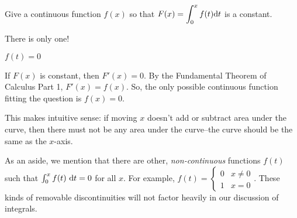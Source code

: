 \begin{question}
Give a continuous function $f(x)$ so that $F(x) = \displaystyle\int_0^x f(t)\mathrm{d}t$ is a constant.
\end{question}
\begin{hint}
There is only one!
\end{hint}
\begin{answer}
$f(t)=0$
\end{answer}
\begin{solution}
If $F(x)$ is constant, then $F'(x)=0$. By the Fundamental Theorem of Calculus Part 1, $F'(x)=f(x)$. So, the only possible continuous function fitting the question is $f(x)=0$.

This makes intuitive sense: if moving $x$ doesn't add or subtract area under the curve, then there must not be any area under the curve--the curve should be the same as the $x$-axis.

As an aside, we mention that there are other, \emph{non-continuous} functions $f(t)$ such that $\int_0^x f(t)\ \mathrm{d}t = 0$ for all $x$. For example, $f(t) = \left\{\begin{array}{cc}
0 & x \neq 0\\
1 & x=0
\end{array}\right.$. These kinds of removable discontinuities will not factor heavily in our discussion of integrals.
\end{solution}

